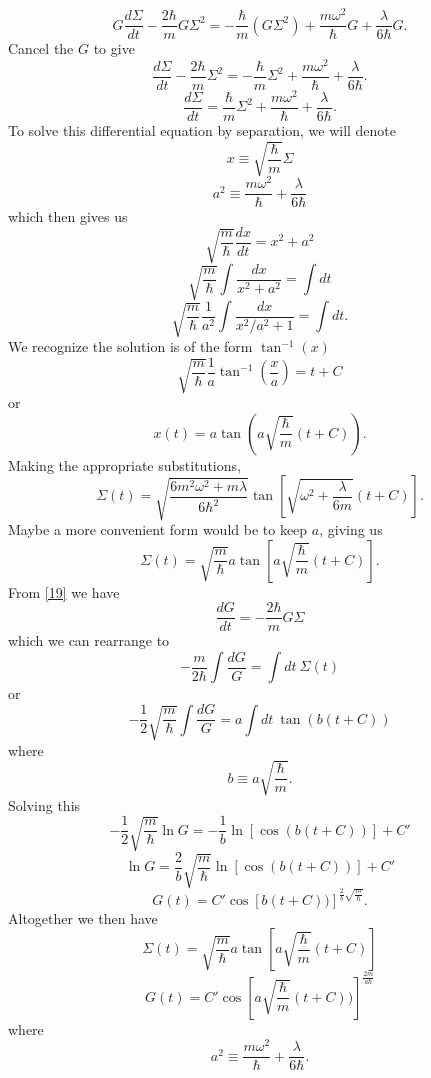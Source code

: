 \documentclass[11pt,letterpaper]{article}
\begin{document}
\begin{enumerate}
\begin{enumerate}
$$G\frac{d\Sigma}{dt}-\frac{2\hbar}{m}G\Sigma^2 =-\frac{\hbar}{m}(G\Sigma^2)+\frac{m\omega^2}{\hbar}G+\frac{\lambda}{6\hbar}G.$$
Cancel the $G$ to give
$$\frac{d\Sigma}{dt}-\frac{2\hbar}{m}\Sigma^2 =-\frac{\hbar}{m}\Sigma^2+\frac{m\omega^2}{\hbar}+\frac{\lambda}{6\hbar}.$$
$$\frac{d\Sigma}{dt}=\frac{\hbar}{m}\Sigma^2+\frac{m\omega^2}{\hbar}+\frac{\lambda}{6\hbar}.$$
To solve this differential equation by separation, we will denote
$$x \equiv \sqrt{\frac{\hbar}{m}}\Sigma$$
$$a^2 \equiv \frac{m\omega^2}{\hbar}+\frac{\lambda}{6\hbar}$$
which then gives us
$$\sqrt{\frac{m}{\hbar}}\frac{dx}{dt} = x^2+a^2$$
$$\sqrt{\frac{m}{\hbar}}\int{\frac{dx}{x^2+a^2}}=\int{dt}$$
$$\sqrt{\frac{m}{\hbar}}\frac{1}{a^2}\int{\frac{dx}{x^2/a^2+1}}=\int{dt} .$$
We recognize the solution is of the form $\tan^{-1}(x)$
$$\sqrt{\frac{m}{\hbar}}\frac{1}{a}\tan^{-1}(\frac{x}{a}) = t + C$$
or
$$x(t) = a\tan\left(a\sqrt{\frac{\hbar}{m}}(t+C)\right).$$
Making the appropriate substitutions,
$$\Sigma(t) = \sqrt{\frac{6m^2\omega^2+m\lambda}{6\hbar^2}}\tan{\left[\sqrt{\omega^2+\frac{\lambda}{6m}}(t+C)\right]}.$$
Maybe a more convenient form would be to keep $a$, giving us
\begin{equation}\label{22}\Sigma(t) = \sqrt{\frac{m}{\hbar}}a\tan{\left[a\sqrt{\frac{\hbar}{m}}(t+C)\right]}.\end{equation}
From \eqref{19} we have
$$\frac{dG}{dt} = -\frac{2\hbar}{m}G\Sigma$$
which we can rearrange to
$$-\frac{m}{2\hbar}\int{\frac{dG}{G}} = \int{dt\ \Sigma(t)}$$
or 
$$-\frac{1}{2}\sqrt{\frac{m}{\hbar}}\int{\frac{dG}{G}} = a\int{dt\ \tan(b(t+C))}$$
where 
$$b \equiv a\sqrt{\frac{\hbar}{m}}.$$
Solving this
$$-\frac{1}{2}\sqrt{\frac{m}{\hbar}}\ln G = -\frac{1}{b}\ln\left[\cos(b(t+C))\right]+C'$$
$$\ln G = \frac{2}{b}\sqrt{\frac{m}{\hbar}}\ln[\cos(b(t+C))]+C'$$
$$G(t) = C'\cos[b(t+C))]^{\frac{2}{b}\sqrt{\frac{m}{\hbar}}}.$$
Altogether we then have
$$\Sigma(t) = \sqrt{\frac{m}{\hbar}}a\tan{\left[a\sqrt{\frac{\hbar}{m}}(t+C)\right]}$$
$$G(t) = C'\cos\left[a\sqrt{\frac{\hbar}{m}}(t+C))\right]^{\frac{2m}{a\hbar}}$$
where $$a^2\equiv\frac{m\omega^2}{\hbar}+\frac{\lambda}{6\hbar}.$$


\end{enumerate}
\end{enumerate}
\end{document}
